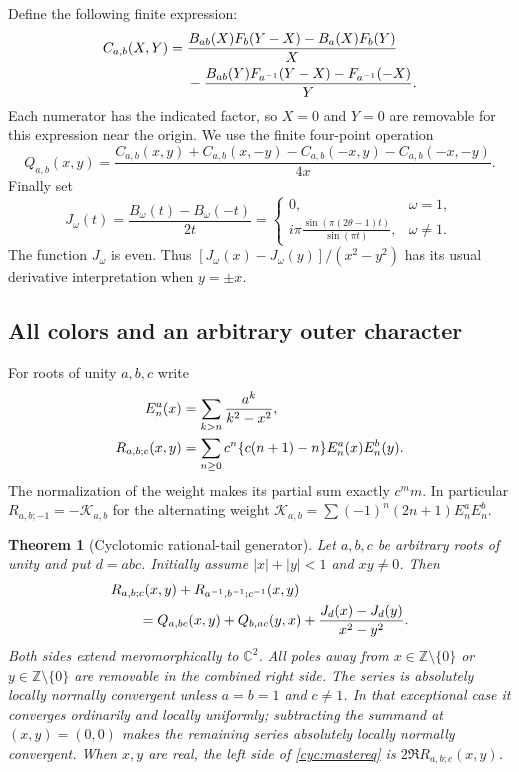 \documentclass[11pt,a4paper]{article}
\numberwithin{equation}{section}
\newtheorem{theorem}{Theorem}[section]
\theoremstyle{definition}
\theoremstyle{remark}
\begin{document}
Define the following finite expression:
\begin{align}\label{cyc:C}
 C_{a,b}(X,Y)={}&
 \frac{B_{ab}(X)F_b(Y-X)-B_a(X)F_b(Y)}X\notag\\
 &-\frac{B_{ab}(Y)F_{a^{-1}}(Y-X)-F_{a^{-1}}(-X)}Y.
\end{align}
Each numerator has the indicated factor, so $X=0$ and $Y=0$ are
removable for this expression near the origin.  We use the finite
four-point operation
\begin{equation}\label{cyc:Q}
 Q_{a,b}(x,y)=\frac{
 C_{a,b}(x,y)+C_{a,b}(x,-y)
 -C_{a,b}(-x,y)-C_{a,b}(-x,-y)}{4x}.
\end{equation}
Finally set
\begin{equation}\label{cyc:J}
 J_\omega(t)=\frac{B_\omega(t)-B_\omega(-t)}{2t}
 =\begin{cases}
 0,&\omega=1,\\[2pt]
 \displaystyle i\pi\frac{\sin(\pi(2\theta-1)t)}{\sin(\pi t)},
       &\omega\ne1.
 \end{cases}
\end{equation}
The function $J_\omega$ is even.  Thus
$[J_\omega(x)-J_\omega(y)]/(x^2-y^2)$ has its usual derivative
interpretation when $y=\pm x$.

\subsection{All colors and an arbitrary outer character}

For roots of unity $a,b,c$ write
\begin{align}
 E_n^a(x)&=\sum_{k>n}\frac{a^k}{k^2-x^2},\notag\\
 R_{a,b;c}(x,y)&=\sum_{n\ge0}c^n\{c(n+1)-n\}
                                      E_n^a(x)E_n^b(y).
 \label{cyc:R}
\end{align}
The normalization of the weight makes its partial sum exactly
$c^m m$.  In particular $R_{a,b;-1}=-\mathcal K_{a,b}$ for the
alternating weight $\mathcal K_{a,b}=\sum(-1)^n(2n+1)E_n^aE_n^b$.

\begin{theorem}[Cyclotomic rational-tail generator]\label{cyc:master}
Let $a,b,c$ be arbitrary roots of unity and put $d=abc$.  Initially
assume $|x|+|y|<1$ and $xy\ne0$.  Then
\begin{align}\label{cyc:mastereq}
 &R_{a,b;c}(x,y)+R_{a^{-1},b^{-1};c^{-1}}(x,y)\notag\\
 &\qquad=Q_{a,bc}(x,y)+Q_{b,ac}(y,x)
                 +\frac{J_d(x)-J_d(y)}{x^2-y^2}.
\end{align}
Both sides extend meromorphically to $\mathbb C^2$.  All poles away
from $x\in\mathbb Z\setminus\{0\}$ or
$y\in\mathbb Z\setminus\{0\}$ are removable in the combined
right side.  The series is absolutely locally normally convergent
unless $a=b=1$ and $c\ne1$.  In that exceptional case it converges
ordinarily and locally uniformly; subtracting the summand at
$(x,y)=(0,0)$ makes the remaining series absolutely locally normally
convergent.  When $x,y$ are real, the left side of
\eqref{cyc:mastereq} is $2\Re R_{a,b;c}(x,y)$.
\end{theorem}
\end{document}
